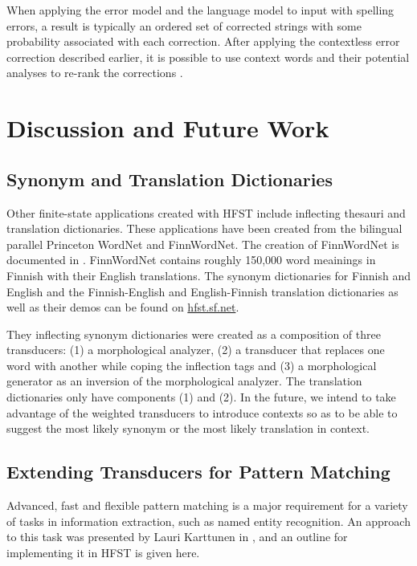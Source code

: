 \documentclass{llncs}
\begin{document}
When applying the error model and the language model to input with spelling errors,
a result is typically an ordered set of corrected strings with some probability
associated with each correction. After applying the contextless error correction
described earlier, it is possible to use context words and their potential
analyses to re-rank the corrections \cite{pirinen/2012/cicling}.


\section{Discussion and Future Work}\label{Discussion}

\subsection{Synonym and Translation Dictionaries}

Other finite-state applications created with HFST include inflecting thesauri and translation dictionaries.
These applications have been created from the bilingual parallel Princeton WordNet and FinnWordNet. 
The creation of FinnWordNet is documented in \cite{linden/2010}. FinnWordNet contains roughly 150,000 
word meainings in Finnish with their English translations. The synonym dictionaries for Finnish and English and the Finnish-English and English-Finnish translation dictionaries as well as their demos can be found on \url{hfst.sf.net}.

They inflecting synonym dictionaries were created as a composition of three transducers: (1) a morphological analyzer, (2) a transducer that replaces one word with another while coping the inflection tags and (3) a morphological generator as an inversion of the morphological analyzer. The translation dictionaries only have components (1) and (2). In the future, we intend to take advantage of the weighted transducers to introduce contexts so as to be able to suggest the most likely synonym or the most likely translation in context.

\subsection{Extending Transducers for Pattern Matching}

Advanced, fast and flexible pattern matching is a major requirement for a
variety of tasks in information extraction, such as named entity recognition.
An approach to this task was presented by Lauri Karttunen in
\cite{karttunen/2011}, and an outline for implementing it in HFST is given here.
\end{document}
